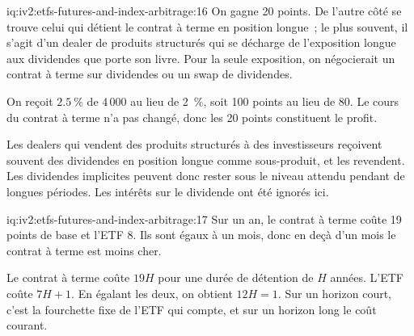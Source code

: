 \begin{solution}{iq:iv2:etfs-futures-and-index-arbitrage:16}
On gagne 20 points. De l'autre côté se trouve celui qui détient le contrat à terme en position longue~; le plus souvent, il s'agit d'un dealer de produits structurés qui se décharge de l'exposition longue aux dividendes que porte son livre. Pour la seule exposition, on négocierait un contrat à terme sur dividendes ou un swap de dividendes.

On reçoit $2.5~\%$ de 4\,000 au lieu de 2~\%, soit 100 points au lieu de 80. Le cours du contrat à terme n'a pas changé, donc les 20 points constituent le profit.

Les dealers qui vendent des produits structurés à des investisseurs reçoivent souvent des dividendes en position longue comme sous-produit, et les revendent. Les dividendes implicites peuvent donc rester sous le niveau attendu pendant de longues périodes. Les intérêts sur le dividende ont été ignorés ici.

\end{solution}

\begin{solution}{iq:iv2:etfs-futures-and-index-arbitrage:17}
Sur un an, le contrat à terme coûte 19 points de base et l'ETF 8. Ils sont égaux à un mois, donc en deçà d'un mois le contrat à terme est moins cher.

Le contrat à terme coûte $19H$ pour une durée de détention de $H$ années. L'ETF coûte $7H + 1$. En égalant les deux, on obtient $12H = 1$. Sur un horizon court, c'est la fourchette fixe de l'ETF qui compte, et sur un horizon long le coût courant.

\end{solution}

